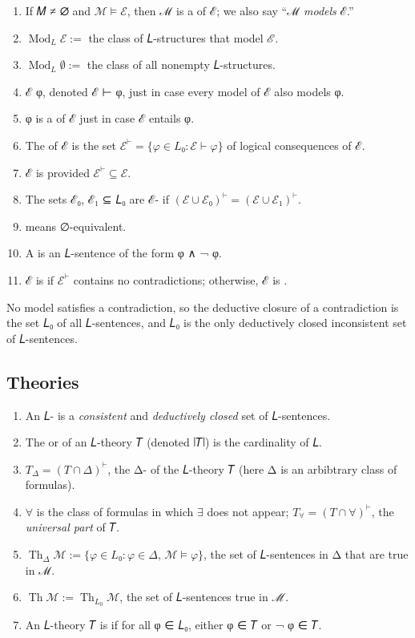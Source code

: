 \documentclass[a4paper,UKenglish,cleveref,autoref,thm-restate,12pt]{lipics-v2021-wjd}
\newcommand{\<}{\langle}
\renewcommand{\>}{\rangle}
\newcommand\bfall{\boldsymbol{\forall}}
\begin{document}
\begin{enumerate}
\item
  If 𝑀 ≠ ∅ and \(ℳ \models ℰ\), then ℳ is a  of ℰ; we also say
  ``ℳ \emph{models} ℰ.''
\item
  \(\operatorname{Mod}_L ℰ :=\) the class of 𝐿-structures that model ℰ.
\item
  \(\operatorname{Mod}_L ∅ :=\) the class of all nonempty 𝐿-structures.
\item
  ℰ  φ, denoted ℰ ⊢ φ, just in case every model of ℰ also models φ.
\item
  φ is a  of ℰ just in case ℰ entails φ.
\item
  The  of ℰ is the set \(ℰ^⊢ = \{φ ∈ 𝐿₀ : ℰ ⊢ φ\}\) of
  logical consequences of ℰ.
\item
  ℰ is  provided \(ℰ^⊢ ⊆ ℰ\).
\item
  The sets ℰ₀, ℰ₁ ⊆ 𝐿₀ are ℰ- if \((ℰ ∪ ℰ₀)^⊢ = (ℰ ∪ ℰ₁)^⊢\).
\item
   means ∅-equivalent.
\item
  A  is an 𝐿-sentence of the form φ ∧ ¬ φ.
\item
  ℰ is  if \(ℰ^⊢\) contains no contradictions; otherwise, ℰ is
  .
\end{enumerate}
\begin{remark*}
No model satisfies a contradiction, so the deductive closure of
a contradiction is the set 𝐿₀ of all 𝐿-sentences, and 𝐿₀ is the only deductively
closed inconsistent set of 𝐿-sentences.
\end{remark*}

\subsection{Theories}\label{theories}

\begin{enumerate}
\item
  An 𝐿- is a \emph{consistent} and \emph{deductively closed} set of
  𝐿-sentences.
\item
  The  or  of an 𝐿-theory 𝑇 (denoted ∣𝑇∣) is the cardinality of 𝐿.
\item
  \(T_Δ = (T ∩ Δ)^⊢\), the Δ- of the 𝐿-theory 𝑇 (here Δ is an
  arbibtrary class of formulas).
\item
  \(\bfall\) is the class of formulas in which \(\exists\) does not appear;
  \(T_{\bfall} = (T ∩ \bfall)^⊢\),  the \emph{universal part} of 𝑇.
\item
  \(\operatorname{Th}_Δ ℳ := \{φ ∈ 𝐿₀ : φ ∈ Δ, \, ℳ \models φ\}\),
  the set of 𝐿-sentences in Δ that are true in ℳ.
\item
  \(\operatorname{Th} ℳ := \operatorname{Th}_{L_0} ℳ\),
  the set of 𝐿-sentences true in ℳ.
\item
  An 𝐿-theory 𝑇 is  if for all φ ∈ 𝐿₀, either φ ∈ 𝑇 or ¬ φ ∈ 𝑇.
\end{enumerate}
\end{document}
